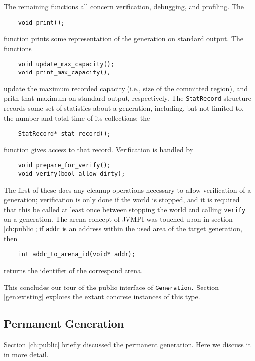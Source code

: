 \documentclass{article}
\begin{document}
The remaining functions all concern verification, debugging, and
profiling.  The
\begin{verbatim}
    void print();
\end{verbatim}
function prints some representation of the generation on standard
output.  The functions
\begin{verbatim}
    void update_max_capacity();
    void print_max_capacity();
\end{verbatim}
update the maximum recorded capacity (i.e., size of the committed
region), and pritn that maximum on standard output, respectively.
The {\tt StatRecord} structure records some set of statistics about a
generation, including, but not limited to, the number and total time
of its collections; the
\begin{verbatim}
    StatRecord* stat_record();
\end{verbatim}
function gives access to that record.  
Verification is handled by
\begin{verbatim}
    void prepare_for_verify();
    void verify(bool allow_dirty);
\end{verbatim}
The first of these does any cleanup operations necessary to allow
verification of a generation; verification is only done if the world
is stopped, and it is required that this be called at least once
between stopping the world and calling {\tt verify} on a generation.
  The arena concept of
JVMPI was touched upon in section \ref{ch:public}; if {\tt addr} is
an address within the used area of the target generation, then 
\begin{verbatim}
    int addr_to_arena_id(void* addr);
\end{verbatim}
returns the identifier of the correspond arena.

This concludes our tour of the public interface of {\tt Generation.}
Section \ref{gen:existing} explores the extant concrete instances of
this type.

\subsection{Permanent Generation}
\label{gen:permgen}

Section \ref{ch:public} briefly discussed the permanent generation.
Here we discuss it in more detail.
\end{document}

